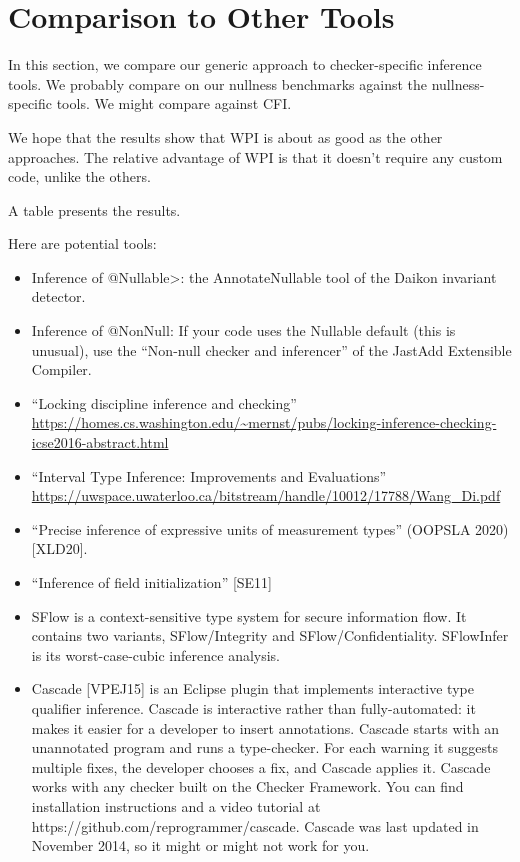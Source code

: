 \section{Comparison to Other Tools}
\label{sec:comparison}

In this section, we compare our generic approach to
checker-specific inference tools. We probably compare
on our nullness benchmarks against the nullness-specific
tools. We might compare against CFI.

We hope that the results show that WPI is about as good as
the other approaches. The relative advantage of WPI is that
it doesn't require any custom code, unlike the others.

A table presents the results.


Here are potential tools:
\begin{itemize}
\item
  Inference of \<@Nullable>: the AnnotateNullable tool of the Daikon invariant detector.
\item
  Inference of @NonNull: If your code uses the Nullable default (this is
  unusual), use the ``Non-null checker and inferencer'' of the JastAdd Extensible Compiler.
\item “Locking discipline inference and checking”
  \url{https://homes.cs.washington.edu/~mernst/pubs/locking-inference-checking-icse2016-abstract.html}
\item
   “Interval Type Inference: Improvements and Evaluations”
  \url{https://uwspace.uwaterloo.ca/bitstream/handle/10012/17788/Wang_Di.pdf}
\item
  “Precise inference of expressive units of measurement types” (OOPSLA
  2020) [XLD20].
\item
  “Inference of field initialization” [SE11]
\item
  SFlow is a context-sensitive type system for secure information flow. It
  contains two variants, SFlow/Integrity and
  SFlow/Confidentiality. SFlowInfer is its worst-case-cubic inference
  analysis.
\item
  Cascade [VPEJ15] is an Eclipse plugin that implements interactive type
  qualifier inference. Cascade is interactive rather than fully-automated:
  it makes it easier for a developer to insert annotations. Cascade starts
  with an unannotated program and runs a type-checker. For each warning it
  suggests multiple fixes, the developer chooses a fix, and Cascade applies
  it. Cascade works with any checker built on the Checker Framework. You
  can find installation instructions and a video tutorial at
  https://github.com/reprogrammer/cascade. Cascade was last updated in
  November 2014, so it might or might not work for you.
\end{itemize}
  
